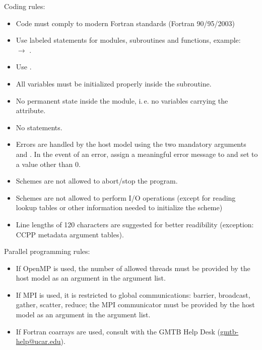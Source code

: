 Coding rules:
\begin{itemize}
\item Code must comply to modern Fortran standards (Fortran 90/95/2003)
\item Use labeled  statements for modules, subroutines and functions, example:\\
 $\rightarrow$ .
\item Use .
\item All  variables must be initialized properly inside the subroutine.
\item No permanent state inside the module, i.\,e. no variables carrying the  attribute.
\item No  statements.
\item Errors are handled by the host model using the two mandatory arguments  and . In the event of an error, assign a meaningful error message to  and set  to a value other than 0.
\item Schemes are not allowed to abort/stop the program.
\item Schemes are not allowed to perform I/O operations (except for reading lookup tables or other information needed to initialize the scheme)
\item Line lengths of 120 characters are suggested for better readibility (exception: CCPP metadata argument tables).
\end{itemize}
Parallel programming rules:
\begin{itemize}
\item If OpenMP is used, the number of allowed threads must be provided by the
  host model as an  argument in the argument list.
\item If MPI is used, it is restricted to global communications: {barrier}, {broadcast}, {gather}, {scatter}, {reduce}; the MPI communicator must be provided by the host model as an  argument in the argument list.
\item If Fortran coarrays are used, consult with the GMTB Help Desk (\url{gmtb-help@ucar.edu}).
\end{itemize}
\begin{sidewaysfigure}

\end{sidewaysfigure}

